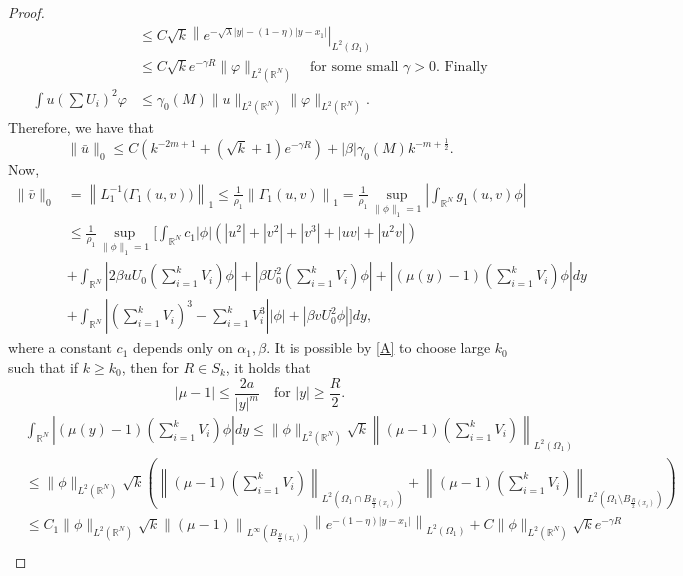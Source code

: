 \documentclass{amsart}
\theoremstyle{definition}
\theoremstyle{remark}
\numberwithin{equation}{section}
\begin{document}
\begin{proof}
\begin{align*}
 &\le C\sqrt{k} \left\|e^{-\sqrt{\lambda}|y| - (1-\eta)|y-x_1|}\right|_{L^2(\Omega_1)}\\
 &\le C \sqrt{k} e^{-\gamma R}\|\varphi\|_{L^2({ \mathbb{R}^N})} \quad \text{for some small $\gamma>0$. Finally}\\
\int u\left(\sum U_i\right)^2\varphi &\le \gamma_0(M) \|u\|_{L^2({ \mathbb{R}^N})}\|\varphi\|_{L^2({ \mathbb{R}^N})}.
 \end{align*}
Therefore, we have that
\begin{equation} \label{p1}
 \|\bar u\|_0 \le C \left (k^{-2m+1} + (\sqrt{k} + 1)e^{-\gamma R}\right) + |\beta|\gamma_0(M)k^{-m + \frac{1}{2}}.
\end{equation}
Now,
 \begin{align*}
  \|\bar v\|_0 &= \left\|L_1^{-1}\Big(\Gamma_1(u,v)\Big)\right\|_1 \le \frac{1}{\rho_1}\left\|\Gamma_1(u,v)\right\|_1 = \frac{1}{\rho_1} \sup_{\|\phi\|_1=1} \left| \int_{ \mathbb{R}^N} g_1(u,v) \phi \right|\\
  &\le  {\frac{1}{\rho_1}}\sup_{\|\phi\|_1=1} \Bigg[  {\int_{ \mathbb{R}^N} c_1} |\phi|\left( |u^2| + |v^2|+ |v^3| + |uv| +|u^2v|\right)  \\
  &+ \int_{\mathbb{R}^N} \left| {2} \beta u U_0\left(\sum_{i=1}^k V_{i}\right)\phi\right| + \left|\beta U_0^2\left(\sum_{i=1}^k V_{i}\right)\phi\right| + \left|(\mu(y)-1)\left(\sum_{i=1}^k V_{i}\right)\phi\right|dy\\
  &  + \int_{\mathbb{R}^N}\left|\left(\sum_{i=1}^k V_{i}\right)^3 - \sum_{i=1}^k V_{i}^3 \right| |\phi| + \left|\beta v U_0^2  \phi\right| \Bigg]dy,
 \end{align*}
 where a constant $c_1$ depends only on $\alpha_1, \beta$. 
It is possible by \eqref{A} to choose large $k_0$ such that if $k\ge k_0$, then for $R \in S_k$, it holds that
$$ |\mu - 1| \le \frac{2a}{|y|^m} \quad \text{for $|y|\ge \frac{R}{2}$}.$$
\begin{align*}
 &\int_{\mathbb{R}^N} \left|(\mu(y)-1)\left(\sum_{i=1}^k V_{i}\right)\phi\right| dy \le \|\phi\|_{L^2(\mathbb{R}^N)} \sqrt{k}\left\| (\mu -1)\left(\sum_{i=1}^k V_{i}\right)\right\|_{L^2(\Omega_1)}\\
 &\le \|\phi\|_{L^2(\mathbb{R}^N)} \sqrt{k}\left(\left\| (\mu -1)\left(\sum_{i=1}^k V_{i}\right)\right\|_{L^2(\Omega_1 \cap B_{\frac{R}{2}(x_i)})} +  \left\| (\mu -1)\left(\sum_{i=1}^k V_{i}\right)\right\|_{L^2(\Omega_1 \setminus  B_{\frac{R}{2}(x_i)})}\right)\\
 &\le C_1\|\phi\|_{L^2(\mathbb{R}^N)} \sqrt{k} \left\| (\mu -1)\right\|_{L^\infty( B_{\frac{R}{2}(x_i)} )} \left\|e^{-(1-\eta)|y-x_1|}\right\|_{L^2(\Omega_1)} + C\|\phi\|_{L^2(\mathbb{R}^N)} \sqrt{k} e^{-\gamma R}\\

\end{align*}
\end{proof}
\end{document}
